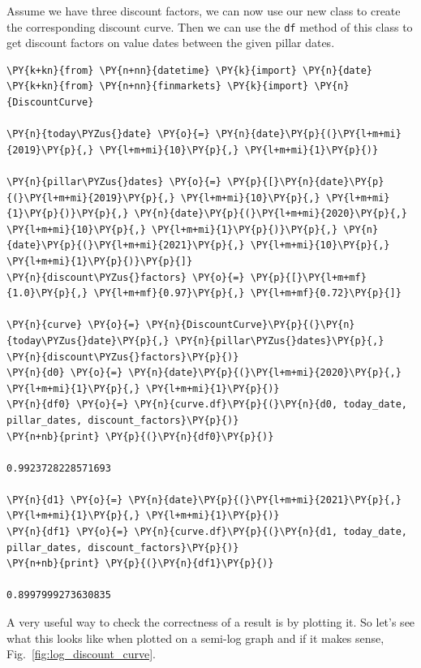 Assume we have three discount factors, we can now use our new class to create the corresponding
discount curve. Then we can use the \texttt{df} method of this class to get discount factors 
on value dates between the given pillar dates.

\begin{codebox}
\begin{Verbatim}[commandchars=\\\{\}]
\PY{k+kn}{from} \PY{n+nn}{datetime} \PY{k}{import} \PY{n}{date}
\PY{k+kn}{from} \PY{n+nn}{finmarkets} \PY{k}{import} \PY{n}{DiscountCurve}
	
\PY{n}{today\PYZus{}date} \PY{o}{=} \PY{n}{date}\PY{p}{(}\PY{l+m+mi}{2019}\PY{p}{,} \PY{l+m+mi}{10}\PY{p}{,} \PY{l+m+mi}{1}\PY{p}{)}
	
\PY{n}{pillar\PYZus{}dates} \PY{o}{=} \PY{p}{[}\PY{n}{date}\PY{p}{(}\PY{l+m+mi}{2019}\PY{p}{,} \PY{l+m+mi}{10}\PY{p}{,} \PY{l+m+mi}{1}\PY{p}{)}\PY{p}{,} \PY{n}{date}\PY{p}{(}\PY{l+m+mi}{2020}\PY{p}{,} \PY{l+m+mi}{10}\PY{p}{,} \PY{l+m+mi}{1}\PY{p}{)}\PY{p}{,} \PY{n}{date}\PY{p}{(}\PY{l+m+mi}{2021}\PY{p}{,} \PY{l+m+mi}{10}\PY{p}{,} \PY{l+m+mi}{1}\PY{p}{)}\PY{p}{]}
\PY{n}{discount\PYZus{}factors} \PY{o}{=} \PY{p}{[}\PY{l+m+mf}{1.0}\PY{p}{,} \PY{l+m+mf}{0.97}\PY{p}{,} \PY{l+m+mf}{0.72}\PY{p}{]}

\PY{n}{curve} \PY{o}{=} \PY{n}{DiscountCurve}\PY{p}{(}\PY{n}{today\PYZus{}date}\PY{p}{,} \PY{n}{pillar\PYZus{}dates}\PY{p}{,} \PY{n}{discount\PYZus{}factors}\PY{p}{)}
\PY{n}{d0} \PY{o}{=} \PY{n}{date}\PY{p}{(}\PY{l+m+mi}{2020}\PY{p}{,} \PY{l+m+mi}{1}\PY{p}{,} \PY{l+m+mi}{1}\PY{p}{)}
\PY{n}{df0} \PY{o}{=} \PY{n}{curve.df}\PY{p}{(}\PY{n}{d0, today_date, pillar_dates, discount_factors}\PY{p}{)}
\PY{n+nb}{print} \PY{p}{(}\PY{n}{df0}\PY{p}{)}

0.9923728228571693

\PY{n}{d1} \PY{o}{=} \PY{n}{date}\PY{p}{(}\PY{l+m+mi}{2021}\PY{p}{,} \PY{l+m+mi}{1}\PY{p}{,} \PY{l+m+mi}{1}\PY{p}{)}
\PY{n}{df1} \PY{o}{=} \PY{n}{curve.df}\PY{p}{(}\PY{n}{d1, today_date, pillar_dates, discount_factors}\PY{p}{)}
\PY{n+nb}{print} \PY{p}{(}\PY{n}{df1}\PY{p}{)}

0.8997999273630835
\end{Verbatim}
\end{codebox}

A very useful way to check the correctness of a result is by plotting it. So let's see what this looks like when plotted on a semi-log graph and if it makes sense, Fig.~\ref{fig:log_discount_curve}.

